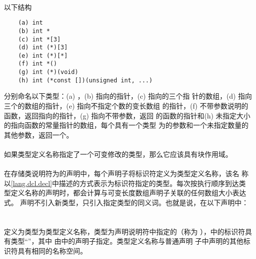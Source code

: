 {\paragraph{}
\ex* 以下结构
\begin{lstlisting}
    (a) int
    (b) int *
    (c) int *[3]
    (d) int (*)[3]
    (e) int (*)[*]
    (f) int *()
    (g) int (*)(void)
    (h) int (*const [])(unsigned int, ...)
\end{lstlisting}
分别命名以下类型：(a) ，(b) 指向的指针，(c) 指向的三个指
针的数组，(d) 指向三个的数组的指针，(e) 指向不指定个数的变长数组
的指针，(f) 不带参数说明的函数，返回指向的指针，(g) 指向不带参数，返回
的函数的指针和(h) 未指定大小的指向函数的常量指针的数组，每个具有一个类型
为的参数和一个未指定数量的其他参数，返回一个。

\syntax
\paragraph{}

\constraint
\paragraph{}
如果类型定义名称指定了一个可变修改的类型，那么它应该具有块作用域。

\semantic
\paragraph{}
在存储类说明符为的声明中，每个声明子将标识符定义为类型定义名称，该名
称以\ref{lang.dcl.decl}中描述的方式表示为标识符指定的类型。每次按执行顺序到达类
型定义名称的声明时，都会计算与可变长度数组声明子关联的任何数组大小表达式。
声明不引入新类型，只引入指定类型的同义词。也就是说，在以下声明中：\\
\mbox{\hspace{4em}}                                \\
\mbox{\hspace{4em}}                                        \\
定义为类型为类型定义名称，类型为声明说明符中指定的（称为
），中的标识符具有类型``”，其中
由中的声明子指定。类型定义名称与普通声明
子中声明的其他标识符具有相同的名称空间。

}
